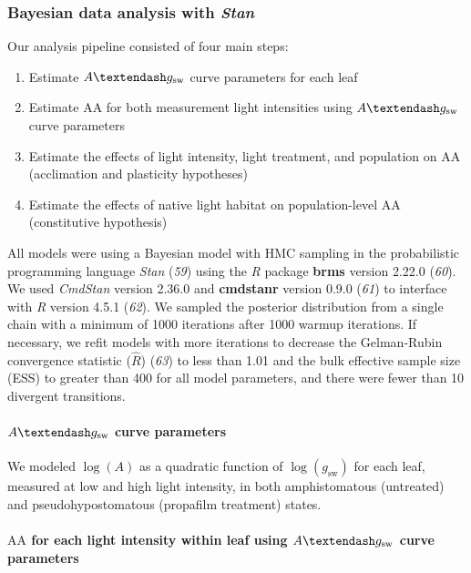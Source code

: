 \documentclass[
  letterpaper,
  DIV=11,
  numbers=noendperiod]{scrartcl}
\let\oldparagraph\paragraph
\renewcommand{\paragraph}[1]{\oldparagraph{#1}\mbox{}}
\providecommand{\tightlist}{%
  \setlength{\itemsep}{0pt}\setlength{\parskip}{0pt}}\usepackage{longtable,booktabs,array}
\newcommand{\aax}{$\mathrm{AA}$}
\newcommand{\agcurve}{$A \textendash g_\text{sw}$}
\newcommand{\loggsw}{$\log(g_\text{sw})$}
\newcommand{\logA}{$\log(A)$}
\begin{document}
\subsubsection{\texorpdfstring{Bayesian data analysis with
\emph{Stan}}{Bayesian data analysis with Stan}}\label{sec-analysis}

Our analysis pipeline consisted of four main steps:

\begin{enumerate}
\def\labelenumi{\arabic{enumi}.}
\tightlist
\item
  Estimate \agcurve{} curve parameters for each leaf
\item
  Estimate \aax{} for both measurement light intensities using
  \agcurve{} curve parameters
\item
  Estimate the effects of light intensity, light treatment, and
  population on \aax{} (acclimation and plasticity hypotheses)
\item
  Estimate the effects of native light habitat on population-level
  \aax{} (constitutive hypothesis)
\end{enumerate}

All models were using a Bayesian model with HMC sampling in the
probabilistic programming language \emph{Stan} (\emph{59}) using the
\emph{R} package \textbf{brms} version 2.22.0 (\emph{60}). We used
\emph{CmdStan} version 2.36.0 and \textbf{cmdstanr} version 0.9.0
(\emph{61}) to interface with \emph{R} version 4.5.1 (\emph{62}). We
sampled the posterior distribution from a single chain with a minimum of
1000 iterations after 1000 warmup iterations. If necessary, we refit
models with more iterations to decrease the Gelman-Rubin convergence
statistic (\(\hat{R}\)) (\emph{63}) to less than 1.01 and the bulk
effective sample size (ESS) to greater than 400 for all model
parameters, and there were fewer than 10 divergent transitions.

\paragraph{\texorpdfstring{\agcurve{} curve
parameters}{ curve parameters}}\label{sec-agcurve-pars}

We modeled \logA{} as a quadratic function of \loggsw{} for each leaf,
measured at low and high light intensity, in both amphistomatous
(untreated) and pseudohypostomatous (propafilm treatment) states.

\paragraph{\texorpdfstring{\aax{} for each light intensity within leaf
using \agcurve{} curve
parameters}{ for each light intensity within leaf using  curve parameters}}\label{sec-aa-est}
\end{document}
